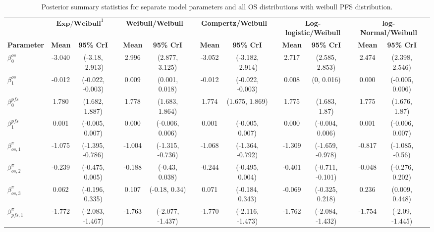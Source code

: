 \documentclass[AMA,STIX1COL]{WileyNJD-v2}
\begin{document}
\begin{landscape}
\begin{center}
\begin{table}[t]
\caption{Posterior summary statistics for separate model parameters and all OS distributions with weibull PFS distribution. \label{tab:post_sep_pfs_weibull}}
\centering
\begin{tabular}{l c c c c c c c c c c c c c c c}
\toprule
\multicolumn{1}{l}{} & \multicolumn{2}{c}{$\textbf{Exp/Weibull}^1$} & & \multicolumn{2}{c}{\textbf{Weibull/Weibull}} & & \multicolumn{2}{c}{\textbf{Gompertz/Weibull}} & & \multicolumn{2}{c}{\textbf{Log-logistic/Weibull}} & & \multicolumn{2}{c}{\textbf{log-Normal/Weibull}}\\
\cmidrule{2-3}\cmidrule{5-6}\cmidrule{8-9}\cmidrule{11-12}\cmidrule{14-15}
\textbf{Parameter} & \textbf{Mean} & \textbf{95\% CrI} & & \textbf{Mean} & \textbf{95\% CrI} & & \textbf{Mean} & \textbf{95\% CrI} & & \textbf{Mean} & \textbf{95\% CrI} & & \textbf{Mean} & \textbf{95\% CrI}\\
\midrule
$\beta^{os}_0$ & -3.040 & (-3.18, -2.913) &  & 2.996 & (2.877, 3.125) &  & -3.052 & (-3.182, -2.914) &  & 2.717 & (2.585, 2.853) &  & 2.474 & (2.398, 2.546) & \\
$\beta^{os}_1$ & -0.012 & (-0.022, -0.003) &  & 0.009 & (0.001, 0.018) &  & -0.012 & (-0.022, -0.003) &  & 0.008 & (0, 0.016) &  & 0.000 & (-0.005, 0.006) & \\
$\beta^{pfs}_0$ & 1.780 & (1.682, 1.887) &  & 1.778 & (1.683, 1.864) &  & 1.774 & (1.675, 1.869) &  & 1.775 & (1.683, 1.87) &  & 1.775 & (1.676, 1.87) & \\
$\beta^{pfs}_1$ & 0.001 & (-0.005, 0.007) &  & 0.000 & (-0.006, 0.006) &  & 0.001 & (-0.005, 0.007) &  & 0.000 & (-0.004, 0.006) &  & 0.001 & (-0.006, 0.007) & \\
$\beta^{\pi}_{os, 1}$ & -1.075 & (-1.395, -0.786) &  & -1.004 & (-1.315, -0.736) &  & -1.068 & (-1.364, -0.792) &  & -1.309 & (-1.659, -0.978) &  & -0.817 & (-1.085, -0.56) & \\
$\beta^{\pi}_{os, 2}$ & -0.239 & (-0.475, 0.005) &  & -0.188 & (-0.43, 0.038) &  & -0.244 & (-0.495, 0.004) &  & -0.401 & (-0.711, -0.101) &  & -0.048 & (-0.276, 0.202) & \\
$\beta^{\pi}_{os, 3}$ & 0.062 & (-0.196, 0.335) &  & 0.107 & (-0.18, 0.34) &  & 0.071 & (-0.184, 0.343) &  & -0.069 & (-0.325, 0.218) &  & 0.236 & (0.009, 0.448) & \\
$\beta^{\pi}_{pfs, 1}$ & -1.772 & (-2.083, -1.467) &  & -1.763 & (-2.077, -1.437) &  & -1.770 & (-2.116, -1.473) &  & -1.762 & (-2.084, -1.432) &  & -1.754 & (-2.09, -1.445) & \\

\end{tabular}
\end{table}
\end{center}
\end{landscape}
\end{document}
